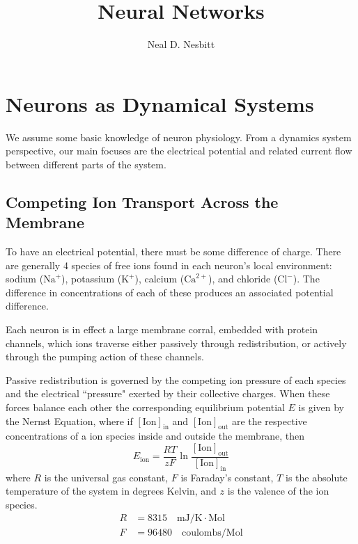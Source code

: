 \documentclass{article}
\title{Neural Networks}
\author{Neal D. Nesbitt}
\begin{document}
\maketitle

\theoremstyle{definition}
\newtheorem{definition}{Definition}[section]
\newtheorem{lemma}{Lemma}[section]


\section{Neurons as Dynamical Systems}
We assume some basic knowledge of neuron physiology. From a dynamics system perspective, our main focuses are the electrical potential and related current flow between different parts of the system.

\subsection{Competing Ion Transport Across the Membrane}
To have an electrical potential, there must be some difference of charge. There are generally 4 species of free ions found in each neuron's local environment: sodium ($\text{Na}^{+}$), potassium ($\text{K}^{+}$), calcium ($\text{Ca}^{2+}$), and chloride ($\text{Cl}^{-}$). The difference in concentrations of each of these produces an associated potential difference.

Each neuron is in effect a large membrane corral, embedded with protein channels, which ions traverse either passively through redistribution, or actively through the pumping action of these channels. 

Passive redistribution is governed by the competing ion pressure of each species and the electrical ``pressure" exerted by their collective charges. When these forces balance each other the corresponding equilibrium potential $E$ is given by the Nernst Equation, where if $[\text{Ion}]_{\text{in}}$ and $[\text{Ion}]_{\text{out}}$ are the respective concentrations of a ion species inside and outside the membrane, then
\[ E_{\text{ion}} =  \frac{RT}{zF} \ln \frac{[\text{Ion}]_{\text{out}}}{[\text{Ion}]_{\text{in}}} \]
where $R$ is the universal gas constant, $F$ is Faraday's constant, $T$ is the absolute temperature of the system in degrees Kelvin, and $z$ is the valence of the ion species.
\begin{align*}
R &= 8315 \quad \text{mJ}/\text{K}\cdot\text{Mol} \\
F &= 96480 \quad \text{coulombs}/\text{Mol}
\end{align*}
\end{document}
